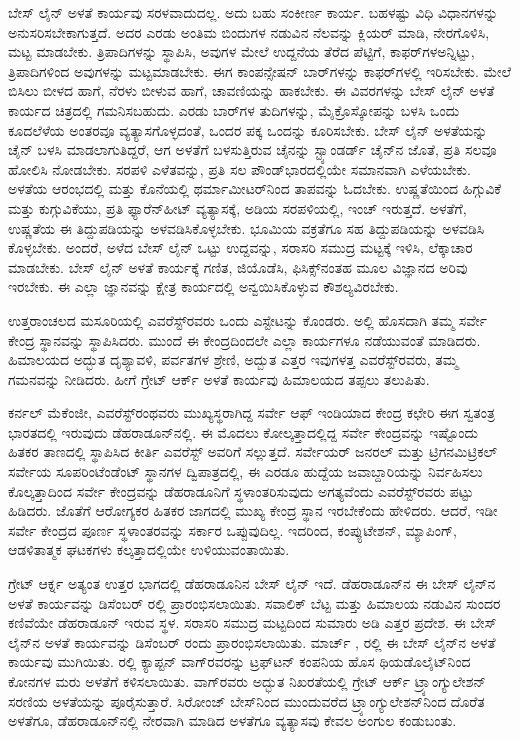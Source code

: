ಬೇಸ್​ ಲೈನ್​ ಅಳತೆ ಕಾರ್ಯವು ಸರಳವಾದುದಲ್ಲ. ಅದು ಬಹು ಸಂಕೀರ್ಣ ಕಾರ್ಯ. ಬಹಳಷ್ಟು ವಿಧಿ ವಿಧಾನಗಳನ್ನು ಅನುಸರಿಸಬೇಕಾಗುತ್ತದೆ. ಅದರ ಎರಡು ಅಂತಿಮ ಬಿಂದುಗಳ ನಡುವಿನ ನೆಲವನ್ನು ಕ್ಲಿಯರ್​ ಮಾಡಿ, ನೇರಗೊಳಿಸಿ, ಮಟ್ಟ ಮಾಡಬೇಕು. ತ್ರಿಪಾದಿಗಳನ್ನು ಸ್ಥಾಪಿಸಿ, ಅವುಗಳ ಮೇಲೆ ಉದ್ದನೆಯ ತೆರೆದ ಪೆಟ್ಟಿಗೆ, ಕಾಫರ್​ಗಳಅನ್ನಿಟ್ಟು, ತ್ರಿಪಾದಿಗಳಿಂದ ಅವುಗಳನ್ನು ಮಟ್ಟಮಾಡಬೇಕು. ಈಗ ಕಾಂಪನ್ಸೇಷನ್​ ಬಾರ್​ಗಳನ್ನು ಕಾಫರ್​ಗಳಲ್ಲಿ ಇರಿಸಬೇಕು. ಮೇಲೆ ಬಿಸಿಲು ಬೀಳದ ಹಾಗೆ, ನೆರಳು ಬೀಳುವ ಹಾಗೆ, ಚಾವಣಿಯನ್ನು ಹಾಕಬೇಕು. ಈ ವಿವರಗಳನ್ನು ಬೇಸ್​ ಲೈನ್​ ಅಳತೆ ಕಾರ್ಯದ ಚಿತ್ರದಲ್ಲಿ ಗಮನಿಸಬಹುದು. ಎರಡು ಬಾರ್​ಗಳ ತುದಿಗಳನ್ನು, ಮೈಕ್ರೊಸ್ಕೋಪನ್ನು ಬಳಸಿ ಒಂದು ಕೂದಲೆಳೆಯ ಅಂತರವೂ ವ್ಯತ್ಯಾಸಗೊಳ್ಳದಂತೆ, ಒಂದರ ಪಕ್ಕ ಒಂದನ್ನು ಕೂರಿಸಬೇಕು. ಬೇಸ್​ ಲೈನ್​ ಅಳತೆಯನ್ನು ಚೈನ್​ ಬಳಸಿ ಮಾಡಲಾಗುತಿದ್ದರೆ, ಆಗ ಅಳತೆಗೆ ಬಳಸುತ್ತಿರುವ ಚೈನನ್ನು ಸ್ಟ್ಯಾಂಡರ್ಡ್ ಚೈನ್​ನ ಜೊತೆ, ಪ್ರತಿ ಸಲವೂ ಹೋಲಿಸಿ ನೋಡಬೇಕು. ಸರಪಳಿ ಎಳೆತವನ್ನು, ಪ್ರತಿ ಸಲ  ಪೌಂಡ್​ ಭಾರದಲ್ಲಿಯೇ ಸಮಾನವಾಗಿ ಎಳೆಯಬೇಕು. ಅಳತೆಯ ಆರಂಭದಲ್ಲಿ ಮತ್ತು ಕೊನೆಯಲ್ಲಿ ಥರ್ಮಾಮೀಟರ್​ನಿಂದ ತಾಪವನ್ನು ಓದಬೇಕು. ಉಷ್ಣತೆಯಿಂದ ಹಿಗ್ಗುವಿಕೆ ಮತ್ತು ಕುಗ್ಗುವಿಕೆಯು, ಪ್ರತಿ ಫ್ಯಾರೆನ್​ಹೀಟ್​ ವ್ಯತ್ಯಾಸಕ್ಕೆ,  ಅಡಿಯ ಸರಪಳಿಯಲ್ಲಿ,  ಇಂಚ್​ ಇರುತ್ತದೆ. ಅಳತೆಗೆ, ಉಷ್ಣತೆಯ ಈ ತಿದ್ದುಪಡಿಯನ್ನು ಅಳವಡಿಸಿಕೊಳ್ಳಬೇಕು. ಭೂಮಿಯ ವಕ್ರತೆಗೂ ಸಹ ತಿದ್ದುಪಡಿಯನ್ನು ಅಳವಡಿಸಿ ಕೊಳ್ಳಬೇಕು. ಅಂದರೆ, ಅಳೆದ ಬೇಸ್​ ಲೈನ್​ ಒಟ್ಟು ಉದ್ದವನ್ನು, ಸರಾಸರಿ ಸಮುದ್ರ ಮಟ್ಟಕ್ಕೆ ಇಳಿಸಿ, ಲೆಕ್ಕಾಚಾರ ಮಾಡಬೇಕು. ಬೇಸ್​ ಲೈನ್​ ಅಳತೆ ಕಾರ್ಯಕ್ಕೆ ಗಣಿತ, ಜಿಯೊಡೆಸಿ, ಫಿಸಿಕ್ಸ್​ ನಂತಹ ಮೂಲ ವಿಜ್ಞಾನದ ಅರಿವು ಇರಬೇಕು. ಈ ಎಲ್ಲಾ ಜ್ಞಾನವನ್ನು ಕ್ಷೇತ್ರ ಕಾರ್ಯದಲ್ಲಿ ಅನ್ವಯಿಸಿಕೊಳ್ಳುವ ಕೌಶಲ್ಯವಿರಬೇಕು.

ಉತ್ತರಾಂಚಲದ ಮಸೂರಿಯಲ್ಲಿ ಎವರೆಸ್ಟ್​ರವರು ಒಂದು ಎಸ್ಟೇಟನ್ನು ಕೊಂಡರು. ಅಲ್ಲಿ ಹೊಸದಾಗಿ ತಮ್ಮ ಸರ್ವೇ ಕೇಂದ್ರ ಸ್ಥಾನವನ್ನು ಸ್ಥಾಪಿಸಿದರು. ಮುಂದೆ ಈ ಕೇಂದ್ರದಿಂದಲೇ ಎಲ್ಲಾ ಕಾರ್ಯಗಳೂ ನಡೆಯುವಂತೆ ಮಾಡಿದರು. ಹಿಮಾಲಯದ ಅದ್ಭುತ ದೃಶ್ಯಾವಳಿ, ಪರ್ವತಗಳ ಶ್ರೇಣಿ, ಅದ್ಬುತ ಎತ್ತರ ಇವುಗಳತ್ತ ಎವರೆಸ್ಟ್​ರವರು, ತಮ್ಮ ಗಮನವನ್ನು ನೀಡಿದರು. ಹೀಗೆ ಗ್ರೇಟ್​ ಆರ್ಕ್ ಅಳತೆ ಕಾರ್ಯವು ಹಿಮಾಲಯದ ತಪ್ಪಲು ತಲುಪಿತು.

ಕರ್ನಲ್​ ಮೆಕೆಂಜೀ, ಎವರೆಸ್ಟ್​ರಂಥವರು ಮುಖ್ಯಸ್ಥರಾಗಿದ್ದ ಸರ್ವೇ ಆಫ್​ ಇಂಡಿಯಾದ ಕೇಂದ್ರ ಕಛೇರಿ ಈಗ ಸ್ವತಂತ್ರ ಭಾರತದಲ್ಲಿ ಇರುವುದು ಡೆಹರಾಡೂನ್​ನಲ್ಲಿ. ಈ ಮೊದಲು ಕೋಲ್ಕತ್ತಾದಲ್ಲಿದ್ದ ಸರ್ವೇ ಕೇಂದ್ರವನ್ನು ಇಷ್ಟೊಂದು ಹಿತಕರ ತಾಣದಲ್ಲಿ ಸ್ಥಾಪಿಸಿದ ಕೀರ್ತಿ ಎವರೆಸ್ಟ್​ ಅವರಿಗೆ ಸಲ್ಲುತ್ತದೆ. ಸರ್ವೇಯರ್​ ಜನರಲ್​ ಮತ್ತು ಟ್ರಿಗನಮಿಟ್ರಿಕಲ್​ ಸರ್ವೇಯ ಸೂಪರಿಂಟೆಂಡೆಂಟ್​ ಸ್ಥಾನಗಳ ದ್ವಿಪಾತ್ರದಲ್ಲಿ, ಈ ಎರಡೂ ಹುದ್ದೆಯ ಜವಾಬ್ದಾರಿಯನ್ನು ನಿರ್ವಹಿಸಲು ಕೊಲ್ಕತ್ತಾದಿಂದ ಸರ್ವೇ ಕೇಂದ್ರವನ್ನು ಡೆಹರಾಡೂನಿಗೆ ಸ್ಥಳಾಂತರಿಸುವುದು ಅಗತ್ಯವೆಂದು ಎವರೆಸ್ಟ್​ರವರು ಪಟ್ಟು ಹಿಡಿದರು. ಜೊತೆಗೆ ಆರೋಗ್ಯಕರ ಹಿತಕರ ಜಾಗದಲ್ಲಿ ಮುಖ್ಯ ಕೇಂದ್ರ ಸ್ಥಾನ ಇರಬೇಕೆಂದು ಹೇಳಿದರು. ಆದರೆ, ಇಡೀ ಸರ್ವೇ ಕೇಂದ್ರದ ಪೂರ್ಣ ಸ್ಥಳಾಂತರವನ್ನು ಸರ್ಕಾರ ಒಪ್ಪುವುದಿಲ್ಲ. ಇದರಿಂದ, ಕಂಪ್ಯುಟೇಶನ್​, ಮ್ಯಾಪಿಂಗ್​, ಆಡಳಿತಾತ್ಮಕ ಘಟಕಗಳು ಕಲ್ಕತ್ತಾದಲ್ಲಿಯೇ ಉಳಿಯುವಂತಾಯಿತು.

ಗ್ರೇಟ್​ ಆರ್ಕ್ನ ಅತ್ಯಂತ ಉತ್ತರ ಭಾಗದಲ್ಲಿ ಡೆಹರಾಡೂನಿನ ಬೇಸ್​ ಲೈನ್​ ಇದೆ. ಡೆಹರಾಡೂನ್​ನ ಈ ಬೇಸ್​ ಲೈನ್​ನ ಅಳತೆ ಕಾರ್ಯವನ್ನು ಡಿಸೆಂಬರ್​  ರಲ್ಲಿ ಪ್ರಾರಂಭಿಸಲಾಯಿತು. ಸವಾಲಿಕ್​ ಬೆಟ್ಟ ಮತ್ತು ಹಿಮಾಲಯ ನಡುವಿನ ಸುಂದರ ಕಣಿವೆಯೇ ಡೆಹರಾಡೂನ್​ ಇರುವ ಸ್ಥಳ. ಸರಾಸರಿ ಸಮುದ್ರ ಮಟ್ಟದಿಂದ ಸುಮಾರು  ಅಡಿ ಎತ್ತರ ಪ್ರದೇಶ. ಈ ಬೇಸ್​ ಲೈನ್​ನ ಅಳತೆ ಕಾರ್ಯವನ್ನು ಡಿಸೆಂಬರ್​  ರಂದು ಪ್ರಾರಂಭಿಸಲಾಯಿತು. ಮಾರ್ಚ್ ,  ರಲ್ಲಿ ಈ ಬೇಸ್​ ಲೈನ್​ನ ಅಳತೆ ಕಾರ್ಯವು ಮುಗಿಯಿತು.  ರಲ್ಲಿ ಕ್ಯಾಪ್ಟನ್​ ವಾಗ್​ರವರನ್ನು ಟ್ರಫ್​ಟನ್​ ಕಂಪನಿಯ ಹೊಸ ಥಿಯಡೊಲೈಟ್​ನಿಂದ ಕೋನಗಳ ಮರು ಅಳತೆಗೆ ಕಳಿಸಲಾಯಿತು. ವಾಗ್​ರವರು ಅದ್ಭುತ ನಿಖರತೆಯಲ್ಲಿ ಗ್ರೇಟ್​ ಆರ್ಕ್ ಟ್ರ್ಯಾಂಗ್ಯುಲೇಶನ್​ ಸರಣಿಯ ಅಳತೆಯನ್ನು ಪೂರೈಸುತ್ತಾರೆ. ಸಿರೋಂಜ್​ ಬೇಸ್​ನಿಂದ ಮುಂದುವರೆದ ಟ್ರ್ಯಾಂಗ್ಯುಲೇಶನ್​ನಿಂದ ದೊರೆತ ಅಳತೆಗೂ, ಡೆಹರಾಡೂನ್​ನಲ್ಲಿ ನೇರವಾಗಿ ಮಾಡಿದ ಅಳತೆಗೂ ವ್ಯತ್ಯಾಸವು ಕೇವಲ  ಅಂಗುಲ ಕಂಡುಬಂತು.

